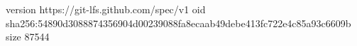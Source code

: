 version https://git-lfs.github.com/spec/v1
oid sha256:54890d3088874356904d00239088fa8ecaab49debe413fc722e4c85a93c6609b
size 87544
